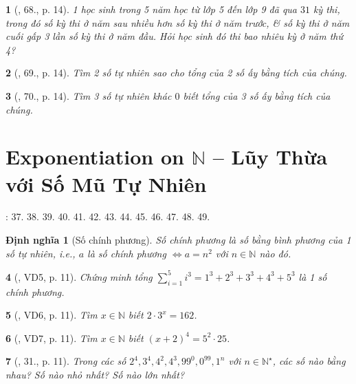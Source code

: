 \documentclass{article}
\newtheorem{baitoan}{}
\newtheorem{dinhnghia}{Định nghĩa}
\begin{document}
\begin{baitoan}[\cite{Binh_Toan_6_tap_1}, 68., p. 14]
	1 học sinh trong 5 năm học từ lớp 5 đến lớp 9 đã qua $31$ kỳ thi, trong đó số kỳ thi ở năm sau nhiều hơn số kỳ thi ở năm trước, \& số kỳ thi ở năm cuối gấp 3 lần số kỳ thi ở năm đầu. Hỏi học sinh đó thi bao nhiêu kỳ ở năm thứ 4?
\end{baitoan}

\begin{baitoan}[\cite{Binh_Toan_6_tap_1}, 69., p. 14]
	Tìm 2 số tự nhiên sao cho tổng của 2 số ấy bằng tích của chúng.
\end{baitoan}

\begin{baitoan}[\cite{Binh_Toan_6_tap_1}, 70., p. 14]
	Tìm 3 số tự nhiên khác $0$ biết tổng của 3 số ấy bằng tích của chúng.
\end{baitoan}


\section{Exponentiation on $\mathbb{N}$ -- Lũy Thừa với Số Mũ Tự Nhiên}
\cite[\S5, pp. 17--18]{SBT_Toan_6_Canh_Dieu_tap_1}: 37. 38. 39. 40. 41. 42. 43. 44. 45. 46. 47. 48. 49. 

\begin{dinhnghia}[Số chính phương]
	{\rm Số chính phương} là số bằng bình phương của 1 số tự nhiên, i.e., $a$ là số chính phương $\Leftrightarrow a = n^2$ với $n\in\mathbb{N}$ nào đó.
\end{dinhnghia}

\begin{baitoan}[\cite{Tuyen_Toan_6}, VD5, p. 11]
	Chứng minh tổng $\sum_{i=1}^5 i^3 = 1^3 + 2^3 + 3^3 + 4^3 + 5^3$ là 1 số chính phương.
\end{baitoan}

\begin{baitoan}[\cite{Tuyen_Toan_6}, VD6, p. 11]
	Tìm $x\in\mathbb{N}$ biết $2\cdot3^x = 162$.
\end{baitoan}

\begin{baitoan}[\cite{Tuyen_Toan_6}, VD7, p. 11]
	Tìm $x\in\mathbb{N}$ biết $(x + 2)^4 = 5^2\cdot25$.
\end{baitoan}

\begin{baitoan}[\cite{Tuyen_Toan_6}, 31., p. 11]
	Trong các số $2^4,3^4,4^2,4^3,99^0,0^{99},1^n$ với $n\in\mathbb{N}^\star$, các số nào bằng nhau? Số nào nhỏ nhất? Số nào lớn nhất?
\end{baitoan}
\end{document}

